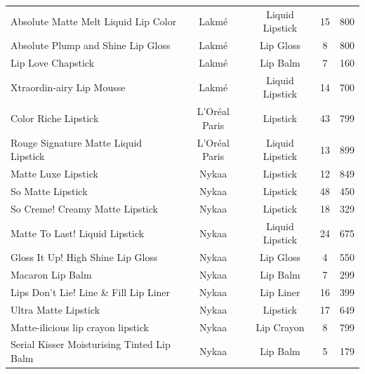 \documentclass{article}
\begin{document}
\begin{longtable}{lcccc}
    Absolute Matte Melt Liquid Lip Color                & Lakmé           & Liquid Lipstick & 15              & 800            \\
    Absolute Plump and Shine Lip Gloss                  & Lakmé           & Lip Gloss       & 8               & 800            \\
    Lip Love Chapstick                                  & Lakmé           & Lip Balm        & 7               & 160            \\
    Xtraordin-airy Lip Mousse                           & Lakmé           & Liquid Lipstick & 14              & 700            \\
    Color Riche Lipstick                                & L'Oréal Paris   & Lipstick        & 43              & 799            \\
    Rouge Signature Matte Liquid Lipstick               & L'Oréal Paris   & Liquid Lipstick & 13              & 899            \\
    Matte Luxe Lipstick                                 & Nykaa           & Lipstick        & 12              & 849            \\
    So Matte Lipstick                                   & Nykaa           & Lipstick        & 48              & 450            \\
    So Creme! Creamy Matte Lipstick                     & Nykaa           & Lipstick        & 18              & 329            \\
    Matte To Last! Liquid Lipstick                      & Nykaa           & Liquid Lipstick & 24              & 675            \\
    Gloss It Up! High Shine Lip Gloss                   & Nykaa           & Lip Gloss       & 4               & 550            \\
    Macaron Lip Balm                                    & Nykaa           & Lip Balm        & 7               & 299            \\
    Lips Don't Lie! Line \& Fill Lip Liner              & Nykaa           & Lip Liner       & 16              & 399            \\
    Ultra Matte Lipstick                                & Nykaa           & Lipstick        & 17              & 649            \\
    Matte-ilicious lip crayon lipstick                  & Nykaa           & Lip Crayon      & 8               & 799            \\
    Serial Kisser Moisturising Tinted Lip Balm          & Nykaa           & Lip Balm        & 5               & 179            \\

\end{longtable}
\end{document}
